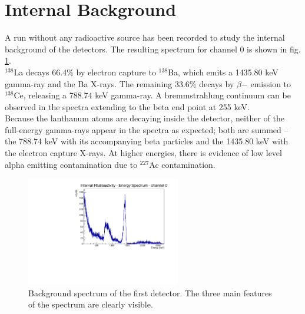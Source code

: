\section{Internal Background}
\label{sec:background}

A run without any radioactive source has been recorded to study the internal background of the detectors. The resulting spectrum for channel 0 is shown in fig. \ref{fig:bkg}.\\

$^{138}$La decays 66.4\% by electron capture to $^{138}$Ba, which emits a 1435.80 keV gamma-ray and the Ba X-rays. The remaining 33.6\% decays by $\beta$− emission to $^{138}$Ce, releasing a 788.74 keV gamma-ray. A bremmstrahlung continuum can be observed in the spectra extending to the beta end point at 255 keV. \\
Because the lanthanum atoms are decaying inside the detector, neither of the full-energy gamma-rays appear in the spectra as expected; both are summed – the 788.74 keV with its accompanying beta particles and the 1435.80 keV with the electron capture X-rays. At higher energies, there is evidence of low level alpha emitting contamination due to $^{227}$Ac contamination. 

\begin{figure}[h!]
\centering
\includegraphics[width=0.6\textwidth]{Images/analysis/bkg/bg.pdf}
\caption{Background spectrum of the first detector. The three main features of the spectrum are clearly visible.}
\label{fig:bkg}
\end{figure}